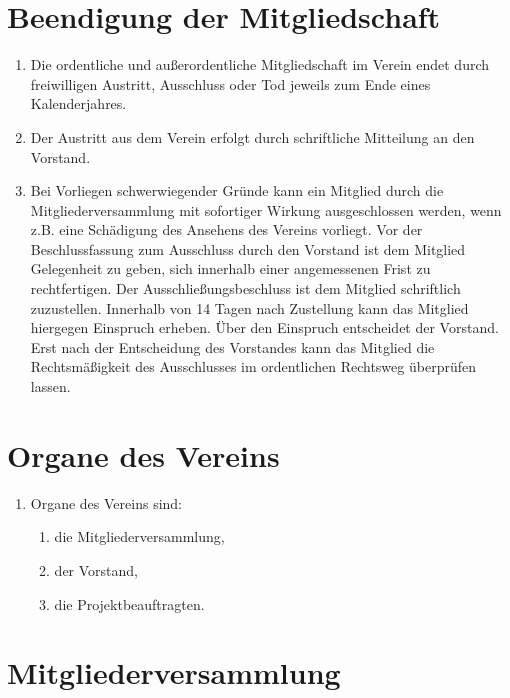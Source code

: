 \documentclass[
  fontsize=12pt,
  paper=a4,
  DIV14,
  parskip,
]{scrartcl}
\begin{document}
\section{Beendigung der Mitgliedschaft}

\begin{enumerate}
	\item Die ordentliche und außerordentliche Mitgliedschaft im Verein endet
		durch freiwilligen Austritt, Ausschluss oder Tod jeweils zum Ende eines
		Kalenderjahres.
	\item Der Austritt aus dem Verein erfolgt durch schriftliche Mitteilung an
		den Vorstand.
	\item Bei Vorliegen schwerwiegender Gründe kann ein Mitglied durch die
		Mitgliederversammlung mit sofortiger Wirkung ausgeschlossen werden,
		wenn z.B. eine Schädigung des Ansehens des Vereins vorliegt.
		Vor der Beschlussfassung zum Ausschluss durch den Vorstand ist dem
		Mitglied Gelegenheit zu geben, sich innerhalb einer angemessenen Frist
		zu rechtfertigen. Der Ausschließungsbeschluss ist dem Mitglied schriftlich
		zuzustellen. Innerhalb von 14 Tagen nach Zustellung kann das Mitglied
		hiergegen Einspruch erheben.
		Über den Einspruch entscheidet der Vorstand. Erst nach der Entscheidung
		des Vorstandes kann das Mitglied die Rechtsmäßigkeit des Ausschlusses im
		ordentlichen Rechtsweg überprüfen lassen.
\end{enumerate}

\section{Organe des Vereins}

\begin{enumerate}
\item[] Organe des Vereins sind:
	\begin{enumerate}
		\item die Mitgliederversammlung,
		\item der Vorstand,
		\item die Projektbeauftragten.
	\end{enumerate}
\end{enumerate}

\section{Mitgliederversammlung}
\end{document}
